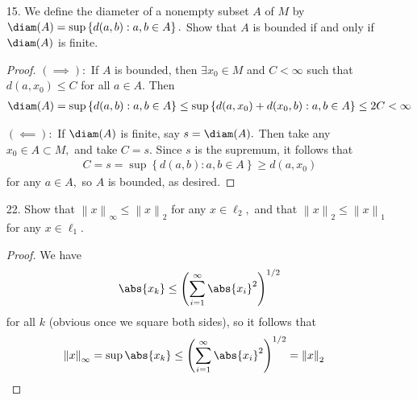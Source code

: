 \documentclass{article}
\begin{document}
\begin{itemize}
\begin{proof}
			$\tau:$ Clearly $\tau$ is non-negative since $d$ and $1$ are non-negative, and
			\begin{align*}
				\tau(x, y) = 0 = \min\left\{ d(x, y), 1 \right\}\iff d(x, y) = 0\iff x=y
			\end{align*}
			It is also symmetric because $d$ is symmetric. Suppose that
			\begin{align*}
				\tau(x, y)+\tau(y, z) &< \tau(x, z) \\
				\min\left\{ d(x, y), 1 \right\} +\min\left\{ d(y, z), 1 \right\} = m_1+m_2 &< \min\left\{ d(x, z), 1 \right\} \\
				\implies m_1+m_2 &< 1, \quad m_1+m_2<d(x, z)
			\end{align*}
			If $m_1+m_2<1,$ then we must have $m_1=d(x, y)$ and $m_2=d(y, z),$ but since $d$ is a metric, $m_1+m_2=d(x, y)+d(y, z) \ge d(x, z),$ so it is impossible for both conditions to be true. Contradiction, so $\tau(x, y)+\tau(y, z)\ge \tau(x, z),$ and $\tau$ is a metric.
		\end{proof}

	\item[15.] We define the diameter of a nonempty subset $A$ of $M$ by $\diam(A)=\sup\left\{ d(a, b):a, b\in A \right\}.$ Show that $A$ is bounded if and only if $\diam(A)$ is finite.
		\begin{proof}
			$(\implies):$ If $A$ is bounded, then $\exists x_0\in M$ and $C<\infty$ such that $d(a, x_0)\le C$ for all $a\in A.$ Then
			\begin{align*}
				\diam(A) = \sup\left\{ d(a, b):a, b\in A \right\} \le \sup\left\{ d(a, x_0)+d(x_0, b):a, b\in A \right\} \le 2C <\infty
			\end{align*}

			$(\impliedby):$ If $\diam(A)$ is finite, say $s=\diam(A).$ Then take any $x_0\in A\subset M,$ and take $C=s.$ Since $s$ is the supremum, it follows that
			\begin{align*}
				C = s =\sup\left\{ d(a, b):a, b\in A \right\} \ge d(a, x_0)
			\end{align*}
			for any $a\in A,$ so $A$ is bounded, as desired.
		\end{proof}

	\item[22.] Show that $\left\lVert x \right\rVert_\infty\le\left\lVert x \right\rVert_2$ for any $x\in\ell_2,$ and that $\left\lVert x \right\rVert_2\le\left\lVert x \right\rVert_1$ for any $x\in\ell_1.$
		\begin{proof}
			We have
			\begin{align*}
				\abs{x_k}\le \left( \sum_{i=1}^{\infty} \abs{x_i}^2 \right)^{1/2}
			\end{align*}
			for all $k$ (obvious once we square both sides), so it follows that
			\begin{align*}
				\left\lVert x \right\rVert_\infty = \sup\abs{x_k} &\le \left( \sum_{i=1}^{\infty} \abs{x_i}^2 \right)^{1/2} = \left\lVert x \right\rVert_2
			\end{align*}


\end{proof}
\end{itemize}
\end{document}
